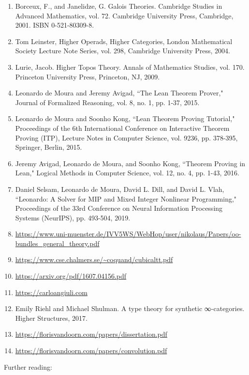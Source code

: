 \documentclass{book}
\theoremstyle{definition}
\begin{document}
{{\begin{enumerate}
\item Borceux, F., and Janelidze, G. Galois Theories. Cambridge Studies in Advanced Mathematics, vol. 72. Cambridge University Press, Cambridge, 2001. ISBN 0-521-80309-8.
\item Tom Leinster, Higher Operads, Higher Categories, London Mathematical Society Lecture Note Series, vol. 298, Cambridge University Press, 2004.
\item Lurie, Jacob. Higher Topos Theory. Annals of Mathematics Studies, vol. 170. Princeton University Press, Princeton, NJ, 2009.
\item Leonardo de Moura and Jeremy Avigad, ``The Lean Theorem Prover," Journal of Formalized Reasoning, vol. 8, no. 1, pp. 1-37, 2015.
\item Leonardo de Moura and Soonho Kong, ``Lean Theorem Proving Tutorial," Proceedings of the 6th International Conference on Interactive Theorem Proving (ITP), Lecture Notes in Computer Science, vol. 9236, pp. 378-395, Springer, Berlin, 2015.
\item Jeremy Avigad, Leonardo de Moura, and Soonho Kong, ``Theorem Proving in Lean," Logical Methods in Computer Science, vol. 12, no. 4, pp. 1-43, 2016.
\item Daniel Selsam, Leonardo de Moura, David L. Dill, and David L. Vlah, ``Leonardo: A Solver for MIP and Mixed Integer Nonlinear Programming," Proceedings of the 33rd Conference on Neural Information Processing Systems (NeurIPS), pp. 493-504, 2019.
\item \url{https://www.uni-muenster.de/IVV5WS/WebHop/user/nikolaus/Papers/oo-bundles_general_theory.pdf}
\item \url{https://www.cse.chalmers.se/~coquand/cubicaltt.pdf}
\item \url{https://arxiv.org/pdf/1607.04156.pdf}
\item \url{https://carloangiuli.com}
\item Emily Riehl and Michael Shulman. A type theory for synthetic ∞-categories. Higher Structures, 2017.
\item \url{https://florisvandoorn.com/papers/dissertation.pdf}
\item \url{https://florisvandoorn.com/papers/convolution.pdf}
\end{enumerate}

Further reading:

}}
\end{document}
